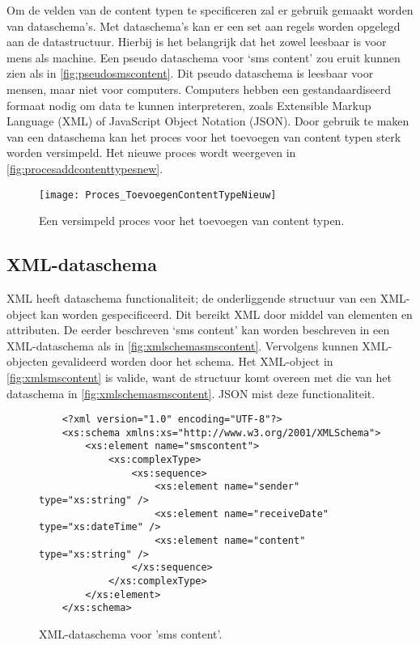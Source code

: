 \pagebreak
\noindent Om de velden van de content typen te specificeren zal er gebruik gemaakt worden van dataschema’s. Met dataschema’s kan er een set aan regels worden opgelegd aan de datastructuur. Hierbij is het belangrijk dat het zowel leesbaar is voor mens als machine. Een pseudo dataschema voor ‘sms content’ zou eruit kunnen zien als in \autoref{fig:pseudosmscontent}.
Dit pseudo dataschema is leesbaar voor mensen, maar niet voor computers. Computers hebben een gestandaardiseerd formaat nodig om data te kunnen interpreteren, zoals Extensible Markup Language (XML) of JavaScript Object Notation (JSON).
Door gebruik te maken van een dataschema kan het proces voor het toevoegen van content typen sterk worden versimpeld. Het nieuwe proces wordt weergeven in \autoref{fig:procesaddcontenttypesnew}.

\begin{figure}[htb]
    \centering
    \texttt{[image: Proces\_ToevoegenContentTypeNieuw]}
    \caption{Een versimpeld proces voor het toevoegen van content typen.}
    \label{fig:procesaddcontenttypesnew}
\end{figure}

\pagebreak
\subsection{XML-dataschema}
XML heeft dataschema functionaliteit; de onderliggende structuur van een XML-object kan worden gespecificeerd. Dit bereikt XML door middel van elementen en attributen. De eerder beschreven ‘sms content’ kan worden beschreven in een XML-dataschema als in \autoref{fig:xmlschemasmscontent}. Vervolgens kunnen XML-objecten gevalideerd worden door het schema. Het XML-object in \autoref{fig:xmlsmscontent} is valide, want de structuur komt overeen met die van het dataschema in \autoref{fig:xmlschemasmscontent}. JSON mist deze functionaliteit.

\begin{figure}[htb]
    \centering
    \begin{lstlisting}
    <?xml version="1.0" encoding="UTF-8"?>
    <xs:schema xmlns:xs="http://www.w3.org/2001/XMLSchema">
        <xs:element name="smscontent">
            <xs:complexType>
                <xs:sequence>
                    <xs:element name="sender" type="xs:string" />
                    <xs:element name="receiveDate" type="xs:dateTime" />
                    <xs:element name="content" type="xs:string" />
                </xs:sequence>
            </xs:complexType>
        </xs:element>
    </xs:schema>                
    \end{lstlisting}
    \caption{XML-dataschema voor 'sms content'.}
    \label{fig:xmlschemasmscontent}
\end{figure}


